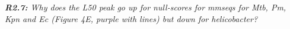 \documentclass[aps,rmp,onecolumn]{revtex4-1}
\newcommand{\Marco}[1]{{\color{orange}Marco: #1}}
\newcommand{\Liam}[1]{{\color{teal}Liam: #1}}
\newcommand{\reviewer}[2]{{\it \textbf{#1:} #2\vskip 5mm}}
\begin{document}
\reviewer{R2.7}{Why does the L50 peak go up for null-scores for mmseqs for Mtb, Pm, Kpn and Ec (Figure 4E, purple with lines) but down for helicobacter?}
\end{document}
